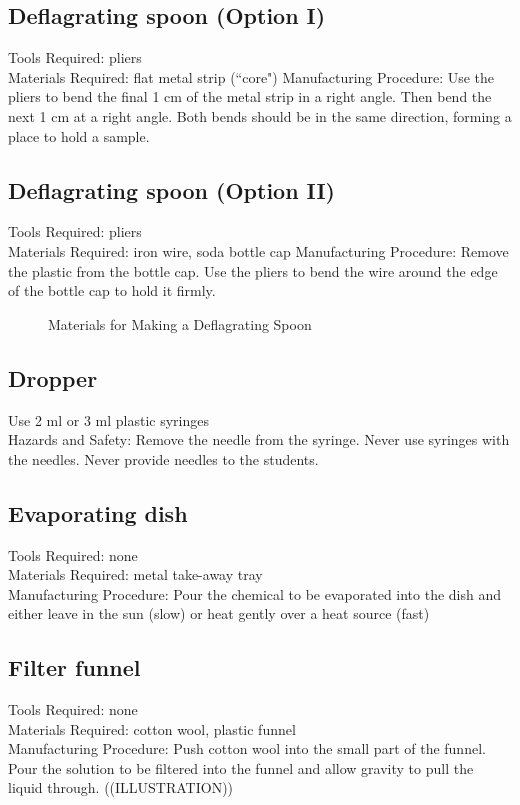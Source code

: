 \subsection*{Deflagrating spoon (Option I)}
Tools Required: pliers\\
Materials Required: flat metal strip (``core")
Manufacturing Procedure: Use the pliers to bend the final 1 cm of the metal strip in a right angle. Then bend the next 1 cm at a right angle. Both bends should be in the same direction, forming a place to hold a sample.



\subsection*{Deflagrating spoon (Option II)}
Tools Required: pliers\\
Materials Required: iron wire, soda bottle cap
Manufacturing Procedure: Remove the plastic from the bottle cap. Use the pliers to bend the wire around the edge of the bottle cap to hold it firmly.



\begin{figure}[h]
\begin{center}
\def\svgwidth{50pt}

\caption{Materials for Making a Deflagrating Spoon}
\end{center}
\end{figure}

\subsection*{Dropper}
Use 2 ml or 3 ml plastic syringes
\\Hazards and Safety: Remove the needle from the syringe. Never use syringes with the needles. Never provide needles to the students.

\subsection*{Evaporating dish}
Tools Required: none\\
Materials Required: metal take-away tray\\
Manufacturing Procedure: Pour the chemical to be evaporated into the dish and either leave in the sun (slow) or heat gently over a heat source (fast)

\subsection*{Filter funnel}
Tools Required: none\\
Materials Required: cotton wool, plastic funnel\\
Manufacturing Procedure: Push cotton wool into the small part of the funnel. Pour the solution to be filtered into the funnel and allow gravity to pull the liquid through. ((ILLUSTRATION))

